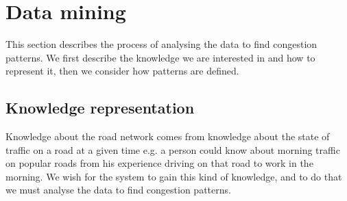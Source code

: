 \section{Data mining}
This section describes the process of analysing the data to find congestion patterns. We first describe the knowledge we are interested in and how to represent it, then we consider how patterns are defined.

\subsection{Knowledge representation}
Knowledge about the road network comes from knowledge about the state of traffic on a road at a given time e.g. a  person could know about morning traffic on popular roads from his experience driving on that road to work in the morning. We wish for the system to gain this kind of knowledge, and to do that we must analyse the data to find congestion patterns.
